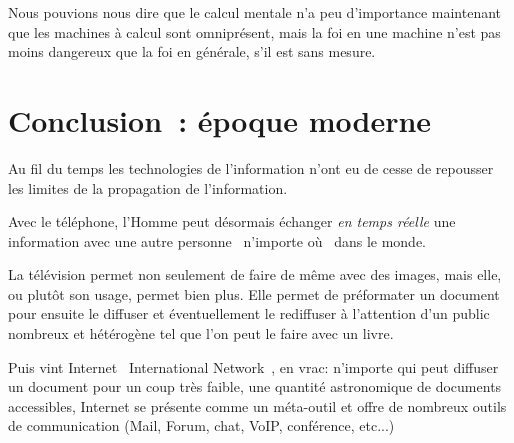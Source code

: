 Nous pouvions nous dire que le calcul mentale n'a peu d'importance maintenant que les machines à calcul sont omniprésent, mais la foi en une machine n'est pas moins dangereux que la foi en générale, s'il est sans mesure. 


\chapter*{Conclusion~: époque moderne}

Au fil du temps les technologies de l'information n'ont eu de cesse de repousser les limites de
la propagation de l'information. 

Avec le téléphone, l'Homme peut désormais échanger \emph{en temps réelle} une 
information avec une autre personne \og{}~n'importe où~\fg{} dans le monde.

La télévision permet non seulement de faire de même avec des images, mais elle,
ou plutôt son usage, permet bien plus. Elle permet de préformater un document pour ensuite le
diffuser et éventuellement le rediffuser à l'attention d'un public nombreux et
hétérogène tel que l'on peut le faire avec un livre.

Puis vint Internet \og{}~International Network~\fg{}, en vrac: n'importe qui
peut diffuser un document pour un coup très faible, une quantité astronomique
de documents accessibles, Internet se présente comme un méta-outil et offre de
nombreux outils de communication (Mail, Forum, chat, VoIP, conférence, etc...)



